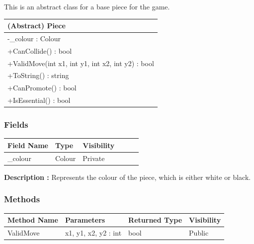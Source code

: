 \documentclass[12pt]{article}
\begin{document}
    This is an abstract class for a base piece for the game.
    \begin{table}[H]
        \begin{tabular}{|l|}
            \hline
            \cellcolor[HTML]{C0C0C0}\textbf{(Abstract) Piece} \\ \hline
            \cellcolor[HTML]{EFEFEF}-\_colour : Colour        \\ \hline
            +CanCollide() : bool                              \\ \hline
            +ValidMove(int x1, int y1, int x2, int y2) : bool \\ \hline
            +ToString() : string                              \\ \hline
            +CanPromote() : bool                              \\ \hline
            +IsEssential() : bool                             \\ \hline
        \end{tabular}
    \end{table}

    \subsubsection{Fields}

    \begin{table}[H]
        \begin{tabular}{llllll}
            \hline
            \multicolumn{1}{|l|}{\cellcolor[HTML]{EFEFEF}\textbf{Field Name}} & \multicolumn{1}{l|}{\cellcolor[HTML]{EFEFEF}\textbf{Type}} & \multicolumn{1}{l|}{\cellcolor[HTML]{EFEFEF}\textbf{Visibility}} \\ \hline
            \multicolumn{1}{|l|}{\_colour}                                    & \multicolumn{1}{l|}{Colour}                                & \multicolumn{1}{l|}{Private}                                     \\ \hline
        \end{tabular}
    \end{table}

    \textbf{Description :} Represents the colour of the piece, which is either white or black.

    \subsubsection{Methods}

    \begin{table}[H]
        \begin{tabular}{|l|l|l|l|}
            \hline
            \rowcolor[HTML]{EFEFEF}
            \cellcolor[HTML]{EFEFEF}\textbf{Method Name} & \textbf{Parameters}  & \textbf{Returned Type} & \textbf{Visibility} \\ \hline
            ValidMove                                    & x1, y1, x2, y2 : int & bool                   & Public              \\ \hline
        \end{tabular}
    \end{table}
\end{document}
